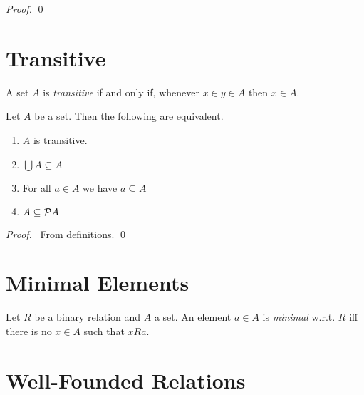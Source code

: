 \begin{proof}
    \pf
    \qed
\end{proof}

\section{Transitive}

\begin{definition}
    A set $A$ is \emph{transitive} if and only if, whenever $x \in y \in A$
    then $x \in A$.
\end{definition}

\begin{theorem}
    Let $A$ be a set. Then the following are equivalent.
    \begin{enumerate}
        \item $A$ is transitive.
        \item $\bigcup A \subseteq A$
        \item For all $a \in A$ we have $a \subseteq A$
        \item $A \subseteq \mathcal{P} A$
    \end{enumerate}
\end{theorem}

\begin{proof}
    \pf\ From definitions. \qed
\end{proof}

\section{Minimal Elements}

\begin{definition}[Minimal]
    Let $R$ be a binary relation and $A$ a set. An element $a \in A$
    is \emph{minimal} w.r.t. $R$ iff there is no $x \in A$
    such that $xRa$.
\end{definition}

\section{Well-Founded Relations}

